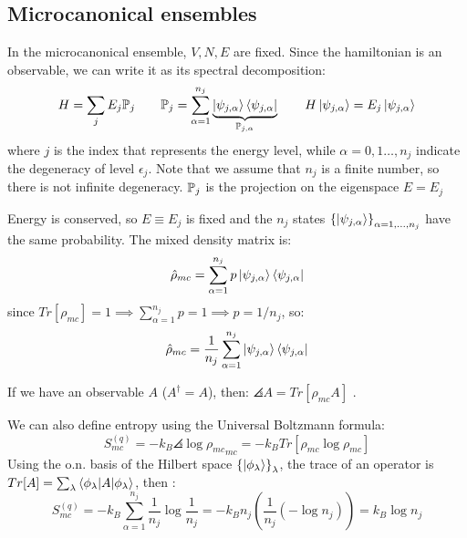 \subsection{Microcanonical ensembles}
In the microcanonical ensemble, $V,N,E$ are fixed. Since the hamiltonian is an observable, we can write it as its spectral decomposition:
$$H = \sum_j E_j \mathbb{P}_j \qquad \mathbb{P}_j = \sum_{\alpha=1}^{n_j} \underbrace{\left|\psi_{j,\alpha}\right\rangle\left\langle\psi_{j,\alpha}\right|}_{\mathbb{P}_{j,\alpha}} \qquad H \left|\psi_{j,\alpha}\right\rangle = E_j\left|\psi_{j,\alpha}\right\rangle$$
where $j$ is the index that represents the energy level, while $\alpha = 0,1 \dots, n_j$  indicate the degeneracy of level $\epsilon_j$. Note that we assume that $n_j$ is a finite number, so there is not infinite degeneracy. $\mathbb{P}_j$ is the projection on the eigenspace $E=E_j$

Energy is conserved, so $E\equiv E_j$ is fixed and the $n_j$ states $\left\{\left|\psi_{j,\alpha}\right\rangle\right\}_{\alpha=1,\dots,n_j}$ have the same probability. The mixed density matrix is:
$$ \hat \rho_{mc} = \sum_{\alpha=1}^{n_j} p\left|\psi_{j,\alpha}\right\rangle \left\langle\psi_{j,\alpha}\right|$$
since $Tr\left[\rho_{mc}\right] = 1 \implies \sum_{\alpha=1}^{n_j} p = 1 \implies p= 1/n_j$, so:
$$ \hat \rho_{mc} = \frac1{n_j}\sum_{\alpha=1}^{n_j} \left|\psi_{j,\alpha}\right\rangle \left\langle\psi_{j,\alpha}\right|$$

If we have an observable $A$ ($A^\dag = A$), then: $\angles A = Tr\left[\rho_{mc}A\right]$ .

We can also define entropy using the Universal Boltzmann formula:
$$S_{mc}^{(q)} = -k_B \angles{\log \rho_{mc}}_{mc} = -k_BTr\left[\rho_{mc}\log\rho_{mc}\right]$$
Using the o.n. basis of the Hilbert space $\left\{\left|\phi_\lambda\right\rangle\right\}_\lambda$, the trace of an operator is $Tr[A] = \sum_\lambda \left\langle \phi_\lambda \middle| A \middle| \phi_\lambda \right\rangle$, then :
$$ S_{mc}^{(q)} = -k_B \sum_{\alpha=1}^{n_j} \frac 1{n_j} \log \frac1{n_j} = -k_B n_j \left(\frac 1{n_j} (-\log n_j)\right) = k_B \log n_j$$

